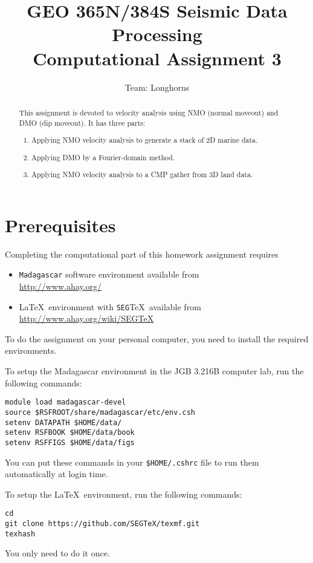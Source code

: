\author{Team: Longhorns}
\title{GEO 365N/384S Seismic Data Processing \\ Computational Assignment 3      }

\begin{abstract}
  This assignment is devoted to velocity analysis using NMO (normal
  moveout) and DMO (dip moveout). It has three parts:
  \begin{enumerate}
  \item Applying NMO velocity analysis to generate a stack of 2D marine data.
  \item Applying DMO by a Fourier-domain method.  
  \item Applying NMO velocity analysis to a CMP gather from 3D land data. 
  \end{enumerate}
\end{abstract}

\section{Prerequisites}

Completing the computational part of this homework assignment requires
\begin{itemize}
\item \texttt{Madagascar} software environment available from \\
\url{http://www.ahay.org/}
\item \LaTeX\ environment with \texttt{SEG}\TeX\ available from \\ 
\url{http://www.ahay.org/wiki/SEGTeX}
\end{itemize}
To do the assignment on your personal computer, you need to install
the required environments. 

To setup the Madagascar environment in the JGB 3.216B computer lab, run the following commands:
\begin{verbatim}
module load madagascar-devel
source $RSFROOT/share/madagascar/etc/env.csh
setenv DATAPATH $HOME/data/
setenv RSFBOOK $HOME/data/book
setenv RSFFIGS $HOME/data/figs
\end{verbatim}
You can put these commands in your \verb+$HOME/.cshrc+ file to run them automatically at login time.

To setup the \LaTeX\ environment, run the following commands:
\begin{verbatim}
cd
git clone https://github.com/SEGTeX/texmf.git
texhash
\end{verbatim}
You only need to do it once.

